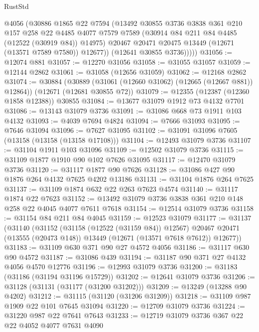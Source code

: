 \begin{lexlean}{RustStd}
\begin{coremodule}
            @4056
            (@30886
              @1865
              @22
              @7594
              (@13492
                @30855
                @3736
                @3838
                @361
                @210
                @157
                @258
                @22
                @4485
                @4077
                @7579
                @7589
                (@30914 @84 @211 @84 @4485 (@12522 (@30919 @84)) @14975)
                @20467
                @20471
                @20475
                @13449
                (@12671 (@13571 @7589 @7580))
                @12677))
            (@12641 @30855 @3736)))))
@31056 := @12074 @881
@31057 := @12270 @31056
@31058 := @31055 @31057
@31059 := @12144 @2862
@31061 := @31058 (@12656 @31059)
@31062 := @12168 @2862
@31074 := @30884
    (@30889 (@31061 (@12660 @31062) (@12665 (@12667 @881)) @12864))
    (@12671 (@12681 @30855 @72))
@31079 := @12355 (@12387 (@12360 @1858 @12388)) @30855
@31084 := @13677 @31079 @1912 @73 @4132 @7701
@31086 := @13143 @31079 @3736
@31091 := @31086 @668 @73 @1911 @103 @4132
@31093 := @4039 @7694 @4824
@31094 := @7666 @31093
@31095 := @7646 @31094
@31096 := @7627 @31095
@31102 := @31091 @31096 @7605 (@13158 (@13158 (@13158 @17108)))
@31104 := @12493 @31079 @3736
@31107 := @31104 @1911 @103 @31096
@31109 := @12502 @31079 @3736
@31115 := @31109 @1877 @1910 @90 @102 @7626 @31095
@31117 := @12470 @31079 @3736
@31120 := @31117 @1877 @90 @7626
@31128 := @31086 @427 @90 @1876 @264 @4132 @7625 @4202 @13186
@31131 := @31104 @1876 @264 @7625
@31137 := @31109 @1874 @632 @22 @263 @7623 @4574
@31140 := @31117 @1874 @22 @7623
@31152 := @13492 @31079 @3736 @3838 @361 @210 @148 @258 @22 @4045 @4077 @7611 @7618
@31154 := @12514 @31079 @3736
@31158 := @31154 @84 @211 @84 @4045
@31159 := @12523 @31079
@31177 := @31137
    (@31140
      (@31152
        (@31158 (@12522 (@31159 @84)) @12567)
        @20467
        @20471
        (@13555 (@20473 @148))
        @13449
        (@12671 (@13571 @7618 @7612))
        @12677))
@31183 := @31109 @630 @371 @90 @27 @4572 @4056
@31186 := @31117 @630 @90 @4572
@31187 := @31086 @439
@31194 := @31187 @90 @371 @27 @4132 @4056 @4570 @12776
@31196 := @12993 @31079 @3736
@31200 := @31183 (@31186 (@31194 @31196 @15729))
@31202 := @12641 @31079 @3736
@31206 := @31128 (@31131 (@31177 (@31200 @31202)))
@31209 := @13249 (@13288 @90 @4202)
@31212 := @31115 (@31120 (@31206 @31209))
@31218 := @31109 @987 @1909 @22 @101 @7645 @31094
@31220 := @12709 @31079 @3736
@31224 := @31220 @987 @22 @7641 @7643
@31233 := @12719 @31079 @3736 @367 @22 @22 @4052 @4077 @7631 @4090

\end{coremodule}
\end{lexlean}
